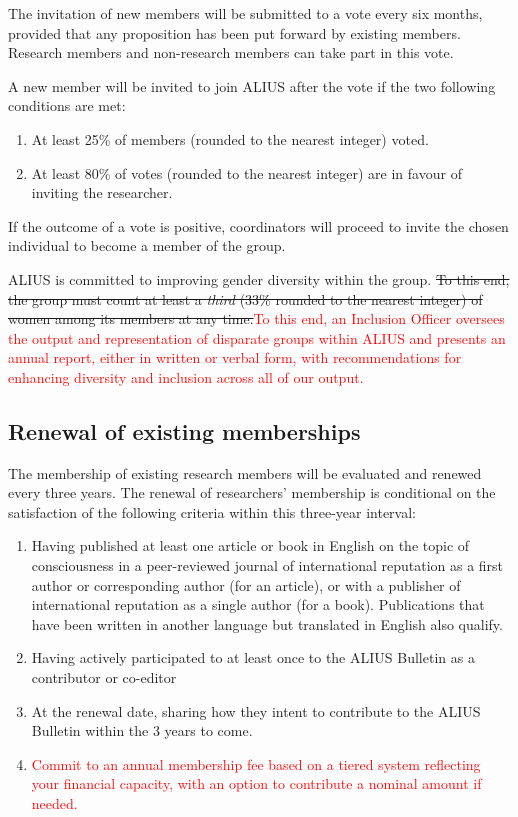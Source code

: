\documentclass[a4paper, 11pt]{scrartcl}
\begin{document}
\noindent The invitation of new members will be submitted to a vote every six months, provided that any proposition has been put forward by existing members. Research members and non-research members can take part in this vote.

A new member will be invited to join ALIUS after the vote if the two following conditions are met:

\begin{enumerate}
\item At least 25\% of members (rounded to the nearest integer) voted.
\item At least 80\% of votes (rounded to the nearest integer) are in favour of inviting the researcher.
\end{enumerate}

\noindent If the outcome of a vote is positive, coordinators will proceed to invite the chosen individual to become a member of the group.

ALIUS is committed to improving gender diversity within the group. \sout{To this end, the group must count at least a \emph{third} (33\% rounded to the nearest integer) of women among its members at any time.}\textcolor{red}{To this end, an Inclusion Officer oversees the output and representation of disparate groups within ALIUS and presents an annual report, either in written or verbal form, with recommendations for enhancing diversity and inclusion across all of our output.}


\subsection{Renewal of existing memberships}
\label{membership_renewal}

The membership of existing research members will be evaluated and renewed every three years. The renewal of researchers' membership is conditional on the satisfaction of the following criteria within this three-year interval:

\begin{enumerate}

\item Having published at least one article or book in English on the topic of consciousness in a peer-reviewed journal of international reputation as a first author or corresponding author (for an article), or with a publisher of international reputation as a single author (for a book). Publications that have been written in another language but translated in English also qualify.

\item Having actively participated to at least once to the ALIUS Bulletin as a contributor or co-editor

\item At the renewal date, sharing how they intent to contribute to the ALIUS Bulletin within the 3 years to come.

\item \textcolor{red}{Commit to an annual membership fee based on a tiered system reflecting your financial capacity, with an option to contribute a nominal amount if needed.}

\end{enumerate}
\end{document}
